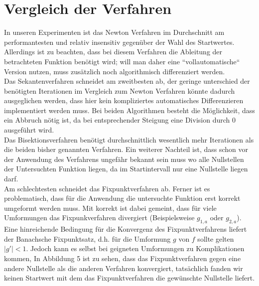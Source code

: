\documentclass[a4paper,12pt]{article}
\newcommand{\1}{1\hspace{-0,9ex}1}
\begin{document}
\section*{Vergleich der Verfahren}
In unseren Experimenten ist das Newton Verfahren im Durchschnitt am performantesten und relativ insensitiv gegenüber der Wahl des Startwertes. Allerdings ist zu beachten, dass bei diesem Verfahren die Ableitung der betrachteten Funktion benötigt wird; will man daher eine ``vollautomatische`` Version nutzen, muss zusätzlich noch algorithmisch differenziert werden. \\
Das Sekantenverfahren schneidet am zweitbesten ab, der geringe unterschied der benötigten Iterationen im Vergleich zum Newton Verfahren könnte dadurch ausgeglichen werden, dass hier kein kompliziertes automatisches Differenzieren implementiert werden muss. Bei beiden Algorithmen besteht die Möglichkeit, dass ein Abbruch nötig ist, da bei entsprechender Steigung eine Division durch 0 ausgeführt wird.\\
Das Bisektionsverfahren benötigt durchschnittlich wesentlich mehr Iterationen als die beiden bisher genannten Verfahren. Ein weiterer Nachteil ist, dass schon vor der Anwendung des Verfahrens ungefähr bekannt sein muss wo alle Nullstellen der Untersuchten Funktion liegen, da im Startintervall nur eine Nullstelle liegen darf.\\
Am schlechtesten schneidet das Fixpunktverfahren ab. Ferner ist es problematisch, dass für die Anwendung die untersuchte Funktion erst korrekt umgeformt werden muss. Mit korrekt ist dabei gemeint, dass für viele Umformungen das Fixpunkverfahren divergiert (Beispielsweise $g_{1,a}$ oder $g_{2,a}$). Eine hinreichende Bedingung für die Konvergenz des Fixpunktverfahrens liefert der Banachsche Fixpunktsatz, d.h. für die Umformung $g$ von $f$ sollte gelten $|g'| < 1$. Jedoch kann es selbst bei geigneten Umformungen zu Komplikationen kommen, In Abbildung 5 ist zu sehen, dass das Fixpunktverfahren gegen eine andere Nullstelle als die anderen Verfahren konvergiert, tatsächlich fanden wir keinen Startwert mit dem das Fixpunktverfahren die gewünschte Nullstelle liefert.
\end{document}
